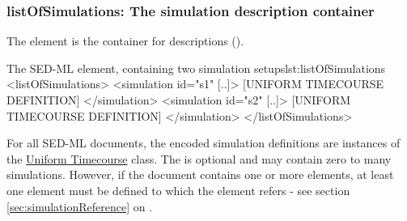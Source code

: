   \subsubsection{listOfSimulations: The simulation description container}
\label{sec:listOfSimulations}

The  element is the container for  descriptions ().
%
%

%
\begin{myXmlLst}{The SED-ML  element, containing two simulation setups}{lst:listOfSimulations}
 <listOfSimulations>
  <simulation id="s1" [..]>
   [UNIFORM TIMECOURSE DEFINITION]
  </simulation>
  <simulation id="s2" [..]>
   [UNIFORM TIMECOURSE DEFINITION]
  </simulation>
 </listOfSimulations>
\end{myXmlLst}
%
For all SED-ML \LoneVtwo documents, the encoded simulation definitions are instances of the \hyperref[class:timeCourse]{Uniform Timecourse} class.  The  is optional and may contain zero to many simulations. However, if the \LoneVtwo document contains  one or more     elements,  at least one   element must be defined to which  the    element refers - see  section \ref{sec:simulationReference} on .


